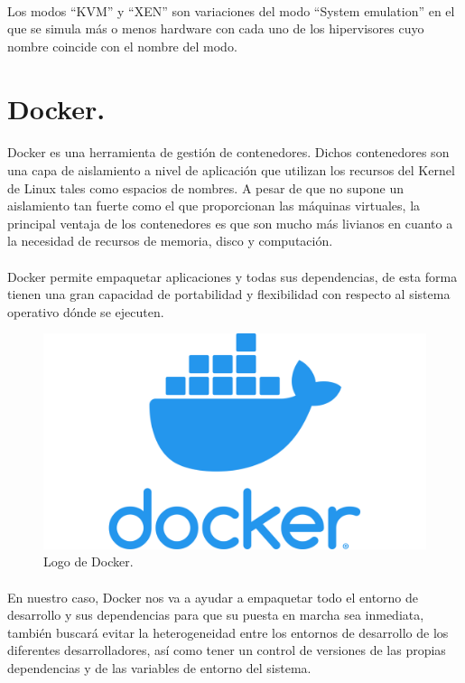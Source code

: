 \paragraph{} Los modos ``\gls{KVM}'' y ``\gls{XEN}'' son variaciones del modo ``System
emulation'' en el que se simula más o menos hardware con cada uno de los hipervisores cuyo
nombre coincide con el nombre del modo.

\section{Docker.}\label{sec:docker}

\paragraph{}Docker es una herramienta de gestión de contenedores. Dichos contenedores son
una capa de aislamiento a nivel de aplicación que utilizan los recursos del Kernel de Linux
tales como espacios de nombres. A pesar de que no supone un aislamiento tan fuerte como
el que proporcionan las máquinas virtuales, la principal ventaja de los contenedores es
que son mucho más livianos en cuanto a la necesidad de recursos de memoria, disco y computación.
\cite{docker}

\paragraph{} Docker permite empaquetar aplicaciones y todas sus dependencias, de esta
forma tienen una gran capacidad de portabilidad y flexibilidad con respecto al sistema
operativo dónde se ejecuten.

\begin{figure}[H]
	\centering
	\includegraphics[width=0.50\linewidth]{imgs/docker-logo}
	\caption[Docker Logo]{Logo de Docker.}
	\label{fig:docker}
\end{figure}

\paragraph{} En nuestro caso, Docker nos va a ayudar a empaquetar todo el entorno de
desarrollo y sus dependencias para que su puesta en marcha sea inmediata, también buscará
evitar la heterogeneidad entre los entornos de desarrollo de los diferentes desarrolladores,
así como tener un control de versiones de las propias dependencias y de las variables
de entorno del sistema.

